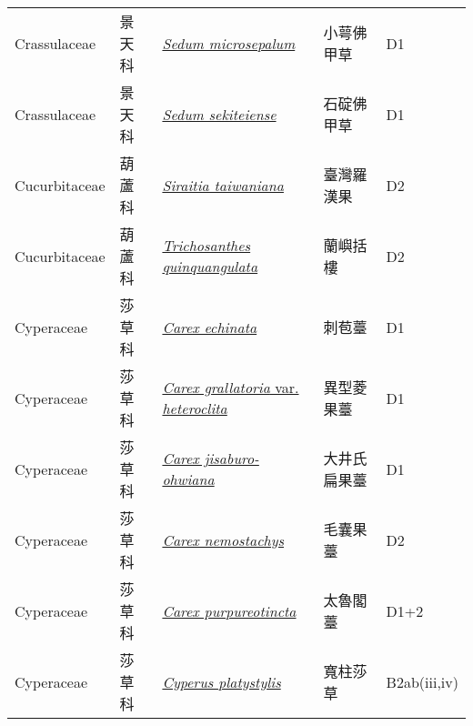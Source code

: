 {\begin{longtable}{p{2.5cm}p{2.5cm}p{4.5cm}p{2.5cm}p{3cm}}
    Crassulaceae & 景天科 & \href{http://www.theplantlist.org/tpl1.1/search?q=Sedum+microsepalum}{\textit{Sedum microsepalum} } & 小萼佛甲草 & D1 \index{Sedum@\textit{Sedum}!microsepalum@\textit{microsepalum}}  \index{小萼佛甲草} \\
    Crassulaceae & 景天科 & \href{http://www.theplantlist.org/tpl1.1/search?q=Sedum+sekiteiense}{\textit{Sedum sekiteiense} } & 石碇佛甲草 & D1 \index{Sedum@\textit{Sedum}!sekiteiense@\textit{sekiteiense}}  \index{石碇佛甲草} \\
    Cucurbitaceae & 葫蘆科 & \href{http://www.theplantlist.org/tpl1.1/search?q=Siraitia+taiwaniana}{\textit{Siraitia taiwaniana} } & 臺灣羅漢果 & D2 \index{Siraitia@\textit{Siraitia}!taiwaniana@\textit{taiwaniana}}  \index{臺灣羅漢果} \\
    Cucurbitaceae & 葫蘆科 & \href{http://www.theplantlist.org/tpl1.1/search?q=Trichosanthes+quinquangulata}{\textit{Trichosanthes quinquangulata} } & 蘭嶼括樓 & D2 \index{Trichosanthes@\textit{Trichosanthes}!quinquangulata@\textit{quinquangulata}}  \index{蘭嶼括樓} \\
    Cyperaceae & 莎草科 & \href{http://www.theplantlist.org/tpl1.1/search?q=Carex+echinata}{\textit{Carex echinata} } & 刺苞薹 & D1 \index{Carex@\textit{Carex}!echinata@\textit{echinata}}  \index{刺苞薹} \\
    Cyperaceae & 莎草科 & \href{http://www.theplantlist.org/tpl1.1/search?q=Carex+grallatoria+var.+heteroclita}{\textit{Carex grallatoria} var. \textit{heteroclita} } & 異型菱果薹 & D1 \index{Carex@\textit{Carex}!grallatoria@\textit{grallatoria}!var. heteroclita@var. \textit{heteroclita}}  \index{異型菱果薹} \\
    Cyperaceae & 莎草科 & \href{http://www.theplantlist.org/tpl1.1/search?q=Carex+jisaburo-ohwiana}{\textit{Carex jisaburo-ohwiana} } & 大井氏扁果薹 & D1 \index{Carex@\textit{Carex}!jisaburo-ohwiana@\textit{jisaburo-ohwiana}}  \index{大井氏扁果薹} \\
    Cyperaceae & 莎草科 & \href{http://www.theplantlist.org/tpl1.1/search?q=Carex+nemostachys}{\textit{Carex nemostachys} } & 毛囊果薹 & D2 \index{Carex@\textit{Carex}!nemostachys@\textit{nemostachys}}  \index{毛囊果薹} \\
    Cyperaceae & 莎草科 & \href{http://www.theplantlist.org/tpl1.1/search?q=Carex+purpureotincta}{\textit{Carex purpureotincta} } & 太魯閣薹 & D1+2 \index{Carex@\textit{Carex}!purpureotincta@\textit{purpureotincta}}  \index{太魯閣薹} \\
    Cyperaceae & 莎草科 & \href{http://www.theplantlist.org/tpl1.1/search?q=Cyperus+platystylis}{\textit{Cyperus platystylis} } & 寬柱莎草 & B2ab(iii,iv) \index{Cyperus@\textit{Cyperus}!platystylis@\textit{platystylis}}  \index{寬柱莎草} \\

\end{longtable}}
